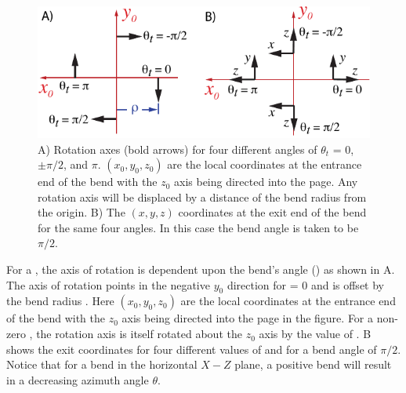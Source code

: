 
\begin{figure}
\centering \includegraphics{tilt-bend.pdf} 
\caption[Orientation of a Bend.] 
  {
A) Rotation axes (bold arrows) for four different  angles of $\theta_t$ = 0, $\pm
\pi/2$, and $\pi$. $(x_0, y_0, z_0)$ are the local coordinates at the entrance end of the bend with
the $z_0$ axis being directed into the page. Any rotation axis will be displaced by a distance of
the bend radius  from the origin. B) The $(x, y, z)$ coordinates at the exit end of the bend
for the same four  angles. In this case the bend angle is taken to be $\pi/2$.
  }
  \label{f:tilt.bend}
\end{figure}


For a , the axis of rotation is dependent upon the bend's  angle
() as shown in A. The axis of rotation points in the negative $y_0$
direction for  = 0 and is offset by the bend radius . Here $(x_0, y_0, z_0)$
are the local coordinates at the entrance end of the bend with the $z_0$ axis being directed into
the page in the figure.  For a non-zero , the rotation axis is itself rotated about the
$z_0$ axis by the value of . B shows the exit coordinates for four
different values of  and for a bend angle  of $\pi/2$.  Notice that for a
bend in the horizontal $X-Z$ plane, a positive bend  will result in a decreasing azimuth
angle $\theta$.

